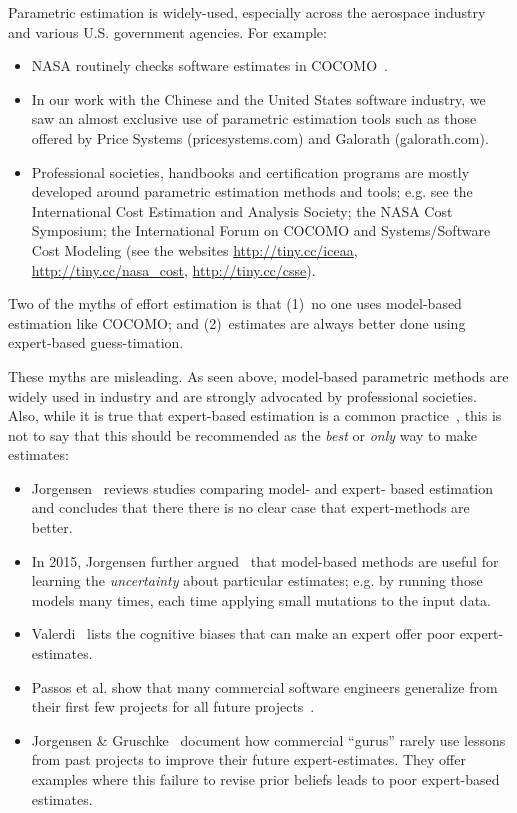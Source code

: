 \documentclass[final,twocolumn,5p]{elsarticle}
\newcommand{\bi}{\begin{itemize}[leftmargin=0.4cm]}
\newcommand{\ei}{\end{itemize}}
\begin{document}
Parametric estimation is
widely-used, especially across the aerospace
industry and various U.S. government agencies. For example:
\bi
\item
NASA routinely checks  software estimates 
in  COCOMO~\cite{dabney07}.  
\item
In our work with the Chinese and the United States software industry,
we saw an   almost exclusive
use  of parametric estimation tools such as those offered by 
Price Systems (pricesystems.com) and  Galorath (galorath.com).
\item
Professional societies, handbooks and
certification programs are mostly developed around 
parametric estimation methods and tools; e.g. see the 
International Cost Estimation and Analysis Society; the
NASA Cost Symposium;  the
International Forum on COCOMO and Systems/Software
Cost Modeling (see the websites \url{http://tiny.cc/iceaa}, \url{http://tiny.cc/nasa_cost}, \url{http://tiny.cc/csse}).
\ei



Two of the myths of effort estimation is that 
(1)~no one uses model-based estimation like COCOMO;
and (2)~estimates are always better done using expert-based guess-timation.

These myths are misleading.
As seen above,  model-based
parametric methods are  widely used in industry and
are strongly advocated by professional societies.
Also, 
while it is true that expert-based estimation is a common practice~\cite{boehm00a}, this is not to say that this should be recommended as the {\em best} or {\em only} way to make estimates:
\bi 
\item
Jorgensen~\cite{Jorgensen2004} reviews studies 
comparing  model- and expert- based estimation and concludes that there
there is no clear case that expert-methods are better.
\item
In 2015, Jorgensen further argued~\cite{jorg15} that   model-based methods are useful for learning the  {\em uncertainty}
about particular estimates; e.g.
by running those models many times, 
each time applying
small mutations to the input data.
\item 
Valerdi~\cite{valerdi11} lists the
cognitive biases that can make an expert offer poor expert-estimates.
\item Passos et al. show that many
commercial software engineers generalize from their
first few projects for all future
projects~\cite{passos11}.
\item
Jorgensen \& Gruschke~\cite{jorgensen09} document how
  commercial  ``gurus'' rarely use lessons
  from past projects to improve their future expert-estimates. 
 They offer examples where this
  failure to revise prior beliefs   leads to poor
 expert-based estimates.
  \ei 
\end{document}
